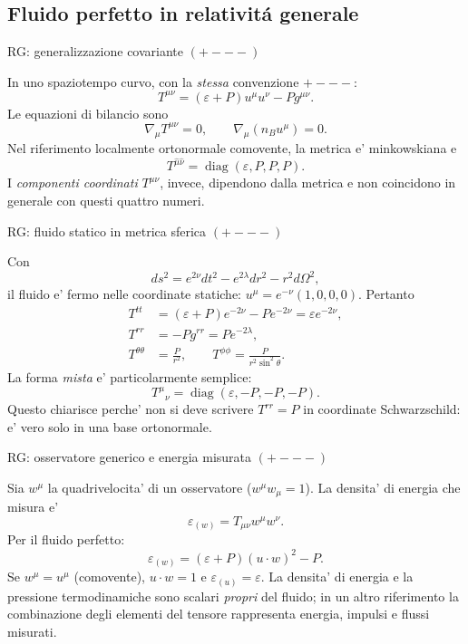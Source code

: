 \subsection{Fluido perfetto in relativit\'a generale}

\begin{frame}[t]{RG: generalizzazione covariante $(+---)$}\small\raggedright

In uno spaziotempo curvo, con la \emph{stessa} convenzione $+---$:
\[
\boxed{T^{\mu\nu}=(\varepsilon+P)u^\mu u^\nu-Pg^{\mu\nu}.}
\]
Le equazioni di bilancio sono
\[
\nabla_\mu T^{\mu\nu}=0,\qquad
\nabla_\mu(n_Bu^\mu)=0.
\]
Nel riferimento localmente ortonormale comovente, la metrica e' minkowskiana e
\[
T^{\hat\mu\hat\nu}=\operatorname{diag}(\varepsilon,P,P,P).
\]
I \emph{componenti coordinati} $T^{\mu\nu}$, invece, dipendono dalla metrica e non coincidono in generale con questi quattro numeri.

\end{frame}

\begin{frame}[t]{RG: fluido statico in metrica sferica $(+---)$}\small\raggedright

Con
\[
ds^2=e^{2\nu}dt^2-e^{2\lambda}dr^2-r^2d\Omega^2,
\]
il fluido e' fermo nelle coordinate statiche: $u^\mu=e^{-\nu}(1,0,0,0)$.
Pertanto
\[
\begin{aligned}
T^{tt}&=(\varepsilon+P)e^{-2\nu}-Pe^{-2\nu}=\varepsilon e^{-2\nu},\\
T^{rr}&=-Pg^{rr}=Pe^{-2\lambda},\\
T^{\theta\theta}&=\frac P{r^2},\qquad
T^{\phi\phi}=\frac P{r^2\sin^2\theta}.
\end{aligned}
\]
La forma \emph{mista} e' particolarmente semplice:
\[
\boxed{T^\mu{}_{\nu}=\operatorname{diag}(\varepsilon,-P,-P,-P).}
\]
Questo chiarisce perche' non si deve scrivere $T^{rr}=P$ in coordinate Schwarzschild: e' vero solo in una base ortonormale.

\end{frame}

\begin{frame}[t]{RG: osservatore generico e energia misurata $(+---)$}\small\raggedright

Sia $w^\mu$ la quadrivelocita' di un osservatore ($w^\mu w_\mu=1$). La densita' di energia che misura e'
\[
\varepsilon_{(w)}=T_{\mu\nu}w^\mu w^\nu.
\]
Per il fluido perfetto:
\[
\varepsilon_{(w)}=(\varepsilon+P)(u\cdot w)^2-P.
\]
Se $w^\mu=u^\mu$ (comovente), $u\cdot w=1$ e $\varepsilon_{(u)}=\varepsilon$.
\medskip
La densita' di energia e la pressione termodinamiche sono scalari \emph{propri} del fluido; in un altro riferimento la combinazione degli elementi del tensore rappresenta energia, impulsi e flussi misurati.

\end{frame}

